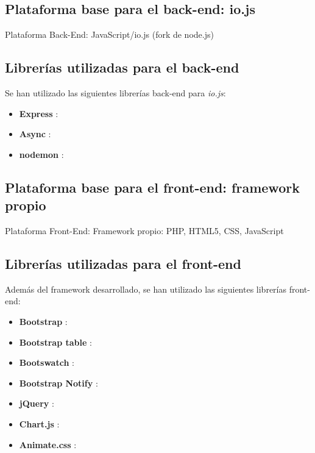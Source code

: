 \subsection*{Plataforma base para el \gls{back-end}: io.js\label{ssec:dp:back-end}}

Plataforma Back-End: JavaScript/io.js (fork de node.js)
\cite{iojs}
\cite{nodejs}
\cite{javascript}

\subsection*{Librerías utilizadas para el \gls{back-end}\label{ssec:dp:back-end-libs}}

Se han utilizado las siguientes librerías \gls{back-end} para \textit{io.js}:

\begin{itemize}
  \item \textbf{Express} \cite{express}:

  \item \textbf{Async} \cite{async}:

  \item \textbf{nodemon} \cite{nodemon}:

\end{itemize}

\subsection*{Plataforma base para el \gls{front-end}: \gls{framework} propio\label{ssec:dp:front-end}}

Plataforma Front-End: Framework propio: PHP, HTML5, CSS, JavaScript
\cite{php}
\cite{html5}
\cite{css}

\subsection*{Librerías utilizadas para el \gls{front-end}\label{ssec:dp:front-end-libs}}

Además del \gls{framework} desarrollado, se han utilizado las siguientes librerías \gls{front-end}:

\begin{itemize}
  \item \textbf{Bootstrap} \cite{bootstrap}:

  \item \textbf{Bootstrap table} \cite{bootstraptable}:

  \item \textbf{Bootswatch} \cite{bootswatch}:

  \item \textbf{Bootstrap Notify} \cite{bootstrapnotify}:

  \item \textbf{jQuery} \cite{jquery}:

  \item \textbf{Chart.js} \cite{chartjs}:

  \item \textbf{Animate.css} \cite{animatecss}:

\end{itemize}